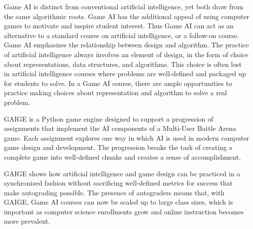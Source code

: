 \documentclass[letterpaper]{article}
\begin{document}
Game AI is distinct from conventional artificial intelligence, yet both draw from the same algorithmic roots.
Game AI has the additional appeal of using computer games to motivate and inspire student interest. 
Thus Game AI can act as an alternative to a standard course on artificial intelligence, or a follow-on course.
Game AI emphasizes the relationship between design and algorithm. 
The practice of artificial intelligence always involves an element of design, in the form of choice about representations, data structures, and algorithms.
This choice is often lost in artificial intelligence courses where problems are well-defined and packaged up for students to solve.
In a Game AI course, there are ample opportunities to practice making choices about representation and algorithm to solve a real problem.


GAIGE is a Python game engine designed to support a progression of assignments that implement the AI components of a Multi-User Battle Arena game.
Each assignment explores one way in which AI is used in modern computer game design and development. 
The progression breaks the task of creating a complete game into well-defined chunks and creates a sense of accomplishment.

GAIGE shows how artificial intelligence and game design can be practiced in a synchronized fashion without sacrificing well-defined metrics for success that make autograding possible.
The presence of autograders means that, with GAIGE, Game AI courses can now be scaled up to large class sizes, which is important as computer science enrollments grow and online instruction becomes more prevalent.





\end{document}
